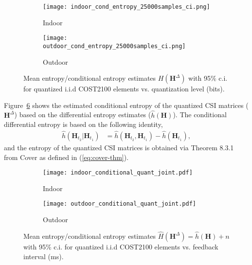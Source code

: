 \begin{figure}[!hbtp] \centering 
	\begin{subfigure}[t]{.48\textwidth}
		\centering
	    \texttt{[image: indoor\_cond\_entropy\_25000samples\_ci.png]}
		\caption{Indoor}
		\label{fig:indoor_cond} 
	\end{subfigure}
	\begin{subfigure}[t]{.48\textwidth}
		\centering
		\texttt{[image: outdoor\_cond\_entropy\_25000samples\_ci.png]}
		\caption{Outdoor}
		\label{fig:outdoor_cond} 
	\end{subfigure}
  \caption{Mean entropy/conditional entropy estimates $H(\mathbf H^{\Delta})$ with 95\% c.i. for quantized i.i.d COST2100 elements vs. quantization level (bits).} 
  \label{fig:cost-ent-est} 
\end{figure}

Figure~\ref{fig:cost-diffent-est} shows the estimated conditional entropy of the quantized CSI matrices ($\mathbf H^{\Delta}$) based on the differential entropy estimates ($\hat h(\mathbf H)$). The conditional differential entropy is based on the following identity,
\begin{align*}
	\hat h(\mathbf H_{t_2} | \mathbf H_{t_1}) &= \hat h(\mathbf H_{t_2}, \mathbf H_{t_1}) - \hat h(\mathbf H_{t_1}),
\end{align*}
and the entropy of the quantized CSI matrices is obtained via Theorem 8.3.1 from Cover \cite{ref:Cover1999Elements} as defined in (\ref{eq:cover-thm}).
\begin{figure}[!hbtp] \centering 
	\begin{subfigure}[t]{.48\textwidth}
  		\texttt{[image: indoor\_conditional\_quant\_joint.pdf]}
		\caption{Indoor} 
		\label{fig:cost-diffent-est-indoor} 
	\end{subfigure}
	\begin{subfigure}[t]{.48\textwidth}
  		\texttt{[image: outdoor\_conditional\_quant\_joint.pdf]}
		\caption{Outdoor} 
		\label{fig:cost-diffent-est-outdoor} 
	\end{subfigure}
  \caption{Mean entropy/conditional entropy estimates $\hat H(\mathbf H^{\Delta}) = \hat h(\mathbf H) + n$ with 95\% c.i. for quantized i.i.d COST2100 elements vs. feedback interval (ms).} 
  \label{fig:cost-diffent-est} 
\end{figure}


